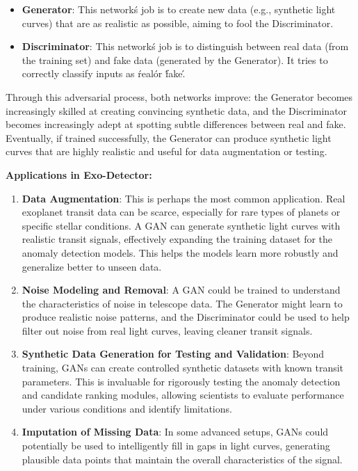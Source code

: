 \documentclass{article}
\begin{document}
\begin{itemize}
    \item \textbf{Generator}: This network\'s job is to create new data (e.g., synthetic light curves) that are as realistic as possible, aiming to fool the Discriminator.
    \item \textbf{Discriminator}: This network\'s job is to distinguish between real data (from the training set) and fake data (generated by the Generator). It tries to correctly classify inputs as \'real\' or \'fake\'.
\end{itemize}

Through this adversarial process, both networks improve: the Generator becomes increasingly skilled at creating convincing synthetic data, and the Discriminator becomes increasingly adept at spotting subtle differences between real and fake. Eventually, if trained successfully, the Generator can produce synthetic light curves that are highly realistic and useful for data augmentation or testing.

\textbf{Applications in Exo-Detector:}

\begin{enumerate}
    \item \textbf{Data Augmentation}: This is perhaps the most common application. Real exoplanet transit data can be scarce, especially for rare types of planets or specific stellar conditions. A GAN can generate synthetic light curves with realistic transit signals, effectively expanding the training dataset for the anomaly detection models. This helps the models learn more robustly and generalize better to unseen data.

    \item \textbf{Noise Modeling and Removal}: A GAN could be trained to understand the characteristics of noise in telescope data. The Generator might learn to produce realistic noise patterns, and the Discriminator could be used to help filter out noise from real light curves, leaving cleaner transit signals.

    \item \textbf{Synthetic Data Generation for Testing and Validation}: Beyond training, GANs can create controlled synthetic datasets with known transit parameters. This is invaluable for rigorously testing the anomaly detection and candidate ranking modules, allowing scientists to evaluate performance under various conditions and identify limitations.

    \item \textbf{Imputation of Missing Data}: In some advanced setups, GANs could potentially be used to intelligently fill in gaps in light curves, generating plausible data points that maintain the overall characteristics of the signal.
\end{enumerate}
\end{document}
